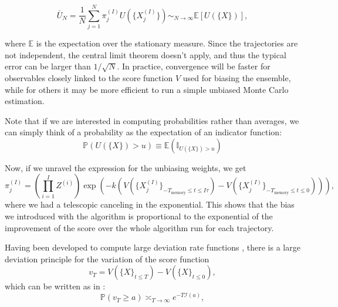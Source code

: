 \begin{equation}\label{eq:veros:unbiased-averaging}
    \bar{U}_N = \frac{1}{N}\sum_{j=1}^N \pi_j^{(I)} U(\{X^{(I)}_j\}) \sim_{N \to \infty} \mathbb{E} \left[ U(\{X\}) \right],
\end{equation}

where $\mathbb{E}$ is the expectation over the stationary measure. Since the trajectories are not independent, the central limit theorem doesn't apply, and thus the typical error can be larger than $1/\sqrt{N}$.
In practice, convergence will be faster for observables closely linked to the score function $V$ used for biasing the ensemble, while for others it may be more efficient to run a simple unbiased Monte Carlo estimation.

Note that if we are interested in computing probabilities rather than averages, we can simply think of a probability as the expectation of an indicator function:
\begin{equation}
    \mathbb{P} \left(U(\{X\}) > u \right) \equiv \mathbb{E} \left( \mathbb{I}_{U(\{X\}) > u}  \right)
\end{equation}

Now, if we unravel the expression for the unbiasing weights, we get
\begin{equation}
    \pi_j^{(I)} = \left(\prod_{i=1}^{I}{Z^{(i)}} \right) \exp \left( -k \left(V(\{X_j^{(I)}\}_{-T_\text{memory} \leq t \leq I\tau}) - V(\{X_j^{(I)}\}_{-T_\text{memory} \leq t \leq 0})\right)  \right),
\end{equation}
where we had a telescopic canceling in the exponential.
This shows that the bias we introduced with the algorithm is proportional to the exponential of the improvement of the score over the whole algorithm run for each trajectory.

Having been developed to compute large deviation rate functions \cite{GIA06}, there is a large deviation principle for the variation of the score function
\begin{equation}\label{eq:veros:delta-score}
    v_T = V(\{X\}_{t \leq T}) - V(\{X\}_{t \leq 0}) ,
\end{equation}
which can be written as in \cite{RAG18}:
\begin{equation}\label{eq:veros:large-deviation-principle}
    \mathbb{P} \left( v_T \geq a \right) \asymp_{T \to \infty} e^{-T\mathcal{I}(a)},
\end{equation}

